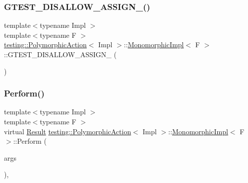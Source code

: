 \subsubsection{\texorpdfstring{G\+T\+E\+S\+T\+\_\+\+D\+I\+S\+A\+L\+L\+O\+W\+\_\+\+A\+S\+S\+I\+G\+N\+\_\+()}{GTEST\_DISALLOW\_ASSIGN\_()}}
{\footnotesize\ttfamily template$<$typename Impl $>$ \\
template$<$typename F $>$ \\
\hyperlink{classtesting_1_1PolymorphicAction}{testing\+::\+Polymorphic\+Action}$<$ Impl $>$\+::\hyperlink{classtesting_1_1PolymorphicAction_1_1MonomorphicImpl}{Monomorphic\+Impl}$<$ F $>$\+::G\+T\+E\+S\+T\+\_\+\+D\+I\+S\+A\+L\+L\+O\+W\+\_\+\+A\+S\+S\+I\+G\+N\+\_\+ (\begin{DoxyParamCaption}\item[{\hyperlink{classtesting_1_1PolymorphicAction_1_1MonomorphicImpl}{Monomorphic\+Impl}$<$ F $>$}]{ }\end{DoxyParamCaption})\hspace{0.3cm}{\ttfamily [private]}}

\mbox{\label{classtesting_1_1PolymorphicAction_1_1MonomorphicImpl_af657293ae1ac638802c0fd2486ee5f5b}} 
\subsubsection{\texorpdfstring{Perform()}{Perform()}}
{\footnotesize\ttfamily template$<$typename Impl $>$ \\
template$<$typename F $>$ \\
virtual \hyperlink{classtesting_1_1ActionInterface_a7477de2fe3e4e01c59db698203acaee7}{Result} \hyperlink{classtesting_1_1PolymorphicAction}{testing\+::\+Polymorphic\+Action}$<$ Impl $>$\+::\hyperlink{classtesting_1_1PolymorphicAction_1_1MonomorphicImpl}{Monomorphic\+Impl}$<$ F $>$\+::Perform (\begin{DoxyParamCaption}\item[{const \hyperlink{classtesting_1_1ActionInterface_af72720d864da4d606629e83edc003511}{Argument\+Tuple} \&}]{args }\end{DoxyParamCaption})\hspace{0.3cm}{\ttfamily [inline]}, {\ttfamily [virtual]}}




